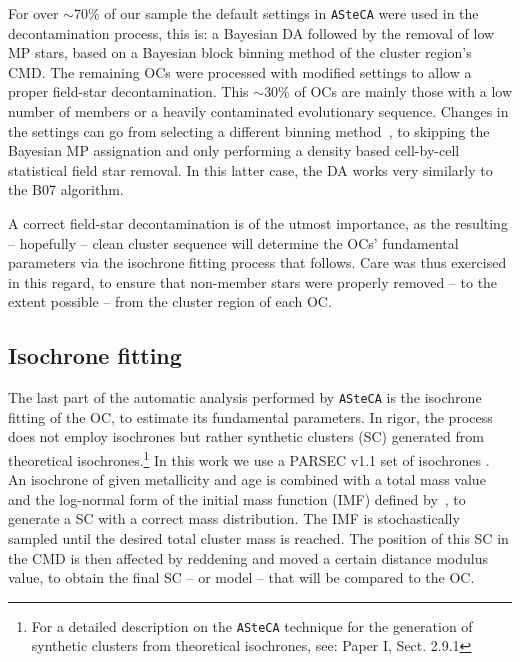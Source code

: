 \documentclass{aa}
\begin{document}
For over ${\sim}$70\% of our sample the default settings in \texttt{ASteCA} were
used in the decontamination process, this is: a Bayesian DA followed by the
removal of low MP stars, based on a Bayesian block binning method of the cluster
region's CMD.\@
%
The remaining OCs were processed with modified settings to allow a proper
field-star decontamination. This ${\sim}$30\% of OCs are mainly those with a
low number of members or a heavily contaminated evolutionary sequence.
Changes in the settings can go from selecting a different binning
method~\citep[often a rectangular grid using Scott's rule,][]{Scott_1979}, to
skipping the Bayesian MP assignation and only performing a density based
cell-by-cell statistical field star removal. In this latter case, the DA works
very similarly to the B07 algorithm.

A correct field-star decontamination is of the utmost importance, as the
resulting -- hopefully -- clean cluster sequence will determine the OCs'
fundamental parameters via the isochrone fitting process that follows. Care was
thus exercised in this regard, to ensure that non-member stars were properly
removed -- to the extent possible -- from the cluster region of each OC.\@



\subsection{Isochrone fitting}
\label{ssec:isoch-fit}

The last part of the automatic analysis performed by \texttt{ASteCA} is the isochrone
fitting of the OC, to estimate its fundamental parameters.
In rigor, the process does not employ isochrones but rather synthetic clusters
(SC) generated from theoretical isochrones.\footnote{For a detailed description
on the \texttt{ASteCA} technique for the generation of synthetic clusters from
theoretical isochrones, see: Paper I, Sect. 2.9.1}
In this work we use a PARSEC v1.1 set of isochrones \citep[][B12]{Bressan_2012}.
%
An isochrone of given metallicity and age is combined with a total mass value
and the log-normal form of the initial mass function (IMF) defined
by~\cite{Chabrier_2001}, to generate a SC with a correct mass distribution.
The IMF is stochastically sampled until the desired total cluster
mass is reached.
%
The position of this SC in the CMD is then affected by reddening and moved a
certain distance modulus value, to obtain the final SC -- or model -- that will
be compared to the OC.\@
\end{document}
